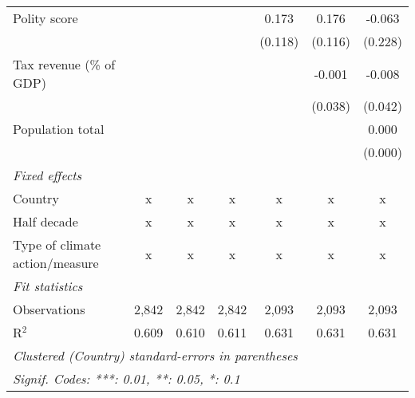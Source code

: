 \begin{tabular}{lcccccc}
   Polity score                                           &             &              &                & 0.173          & 0.176          & -0.063\\   
                                                          &             &              &                & (0.118)        & (0.116)        & (0.228)\\   
   Tax revenue (\% of GDP)                                &             &              &                &                & -0.001         & -0.008\\   
                                                          &             &              &                &                & (0.038)        & (0.042)\\   
   Population total                                       &             &              &                &                &                & 0.000\\   
                                                          &             &              &                &                &                & (0.000)\\   
   \emph{Fixed effects}\\
   Country                                                & x           & x            & x              & x              & x              & x\\  
   Half decade                                            & x           & x            & x              & x              & x              & x\\  
   Type of climate action/measure                         & x           & x            & x              & x              & x              & x\\  
   \midrule \emph{Fit statistics}\\
   Observations                                           & 2,842       & 2,842        & 2,842          & 2,093          & 2,093          & 2,093\\  
   R$^2$                                                  & 0.609       & 0.610        & 0.611          & 0.631          & 0.631          & 0.631\\  
   \midrule
   \multicolumn{7}{l}{\emph{Clustered (Country) standard-errors in parentheses}}\\
   \multicolumn{7}{l}{\emph{Signif. Codes: ***: 0.01, **: 0.05, *: 0.1}}\\
\end{tabular}
\par\endgroup


